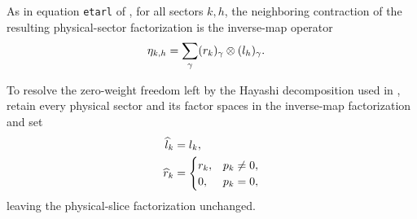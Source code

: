 \begin{lemma}
    \label{thm:mpdo_inverse_map_factorization_neighboring_operator}
    \leanok
    As in equation \texttt{etarl} of
    \cite[Appendix~C.2, lines~1441--1445]{Cirac2016MPDO_arXiv}, for all sectors
    $k,h$, the neighboring contraction of the resulting physical-sector
    factorization is the inverse-map operator
    \begin{align}
        \eta_{k,h}
         & =\sum_\gamma (r_k)_\gamma\otimes(l_h)_\gamma.
        \notag
    \end{align}
\end{lemma}

\begin{definition}
    \label{def:mpdo_zero_weight_reparameterized_inverse_map_factorization}
    \leanok
    To resolve the zero-weight freedom left by the Hayashi decomposition used
    in \cite[Appendix~C.2, lines~1415--1445]{Cirac2016MPDO_arXiv}, retain every
    physical sector and its factor spaces in the inverse-map factorization and
    set
    \begin{align}
        \widehat l_k & =l_k,
        \notag               \\
        \widehat r_k & =
        \begin{cases}
            r_k, & p_k\ne0, \\
            0,   & p_k=0,
        \end{cases}
        \notag
    \end{align}
    leaving the physical-slice factorization unchanged.
\end{definition}

